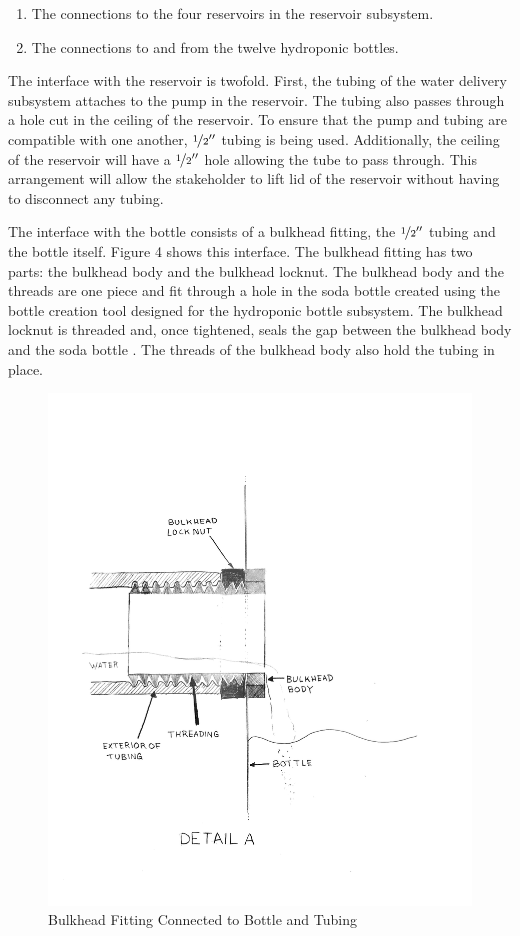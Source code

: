 \documentclass[12pt]{article}
\begin{document}
\begin{enumerate}
    \item The connections to the four reservoirs in the reservoir subsystem.
    \item The connections to and from the twelve hydroponic bottles.
\end{enumerate}

The interface with the reservoir is twofold. First, the tubing of the water delivery subsystem
attaches to the pump in the reservoir. The tubing also passes through a hole cut in the ceiling of
the reservoir. To ensure that the pump and tubing are compatible with one another,
$\nicefrac{1}{2}''$ tubing is being used. Additionally, the ceiling of the reservoir will have a
$\nicefrac{1}{2}''$ hole allowing the tube to pass through. This arrangement will allow the
stakeholder to lift lid of the reservoir without having to disconnect any tubing.

The interface with the bottle consists of a bulkhead fitting, the $\nicefrac{1}{2}''$ tubing and the
bottle itself. Figure 4 shows this interface. The bulkhead fitting has two parts: the bulkhead
body and the bulkhead locknut. The bulkhead body and the threads are one piece and fit through a
hole in the soda bottle created using the bottle creation tool designed for the hydroponic bottle
subsystem. The bulkhead locknut is threaded and, once tightened, seals the gap between the bulkhead
body and the soda bottle \cite{uspc}. The threads of the bulkhead body also hold the tubing in
place.

\begin{figure}[H]
    \centering
    \includegraphics[width=163mm]{resources/detail-a.png}
    \caption{Bulkhead Fitting Connected to Bottle and Tubing}
\end{figure}
\end{document}

